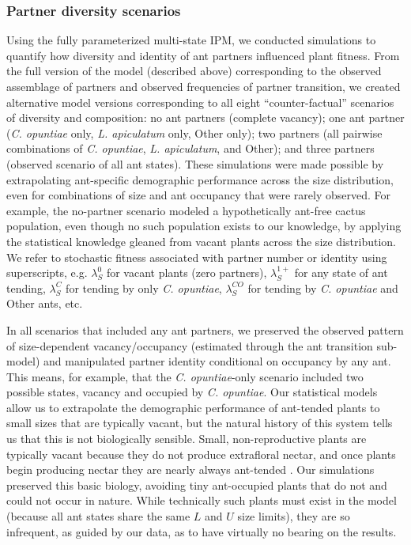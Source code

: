\documentclass[11pt]{article}
\begin{document}
\subsubsection*{Partner diversity scenarios}
Using the fully parameterized multi-state IPM, we conducted simulations to quantify how diversity and identity of ant partners influenced plant fitness. 
From the full version of the model (described above) corresponding to the observed assemblage of partners and observed frequencies of partner transition, we created alternative model versions corresponding to all eight ``counter-factual'' scenarios of diversity and composition: no ant partners (complete vacancy); one ant partner (\textit{C. opuntiae} only, \textit{L. apiculatum} only, Other only); two partners (all pairwise combinations of \textit{C. opuntiae}, \textit{L. apiculatum}, and Other); and three partners (observed scenario of all ant states).
These simulations were made possible by extrapolating ant-specific demographic performance across the size distribution, even for combinations of size and ant occupancy that were rarely observed. 
For example, the no-partner scenario modeled a hypothetically ant-free cactus population, even though no such population exists to our knowledge, by applying the statistical knowledge gleaned from vacant plants across the size distribution. 
We refer to stochastic fitness associated with partner number or identity using superscripts, e.g. $\lambda^{0}_{S}$ for vacant plants (zero partners), $\lambda^{1+}_{S}$ for any state of ant tending, $\lambda^{C}_{S}$ for tending by only \textit{C. opuntiae}, $\lambda^{CO}_{S}$ for tending by \textit{C. opuntiae} and Other ants, etc.

In all scenarios that included any ant partners, we preserved the observed pattern of size-dependent vacancy/occupancy (estimated through the ant transition sub-model) and manipulated partner identity conditional on occupancy by any ant. 
This means, for example, that the \textit{C. opuntiae}-only scenario included two possible states, vacancy and occupied by \textit{C. opuntiae}. 
Our statistical models allow us to extrapolate the demographic performance of ant-tended plants to small sizes that are typically vacant, but the natural history of this system tells us that this is not biologically sensible. 
Small, non-reproductive plants are typically vacant because they do not produce extrafloral nectar, and once plants begin producing nectar they are nearly always ant-tended \citep{Miller2014}. 
Our simulations preserved this basic biology, avoiding tiny ant-occupied plants that do not and could not occur in nature. 
While technically such plants must exist in the model (because all ant states share the same $L$ and $U$ size limits), they are so infrequent, as guided by our data, as to have virtually no bearing on the results.
\end{document}
